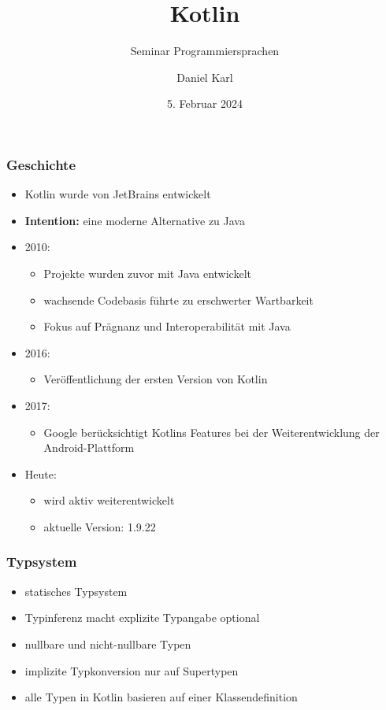 \documentclass{beamer}
\title{Kotlin}
\subtitle{Seminar Programmiersprachen}
\author[D. Karl]
{Daniel Karl}
\date{5. Februar 2024}
\begin{document}
\maketitle


\begin{frame}
\frametitle{Geschichte}
\begin{itemize}
    \item Kotlin wurde von JetBrains entwickelt
    \item \textbf{Intention:} eine moderne Alternative zu Java
    \item 2010:
    \begin{itemize}
        \item Projekte wurden zuvor mit Java entwickelt
        \item wachsende Codebasis führte zu erschwerter Wartbarkeit
        \item Fokus auf Prägnanz und Interoperabilität mit Java
    \end{itemize}
    \item 2016:
    \begin{itemize}
        \item Veröffentlichung der ersten Version von Kotlin
    \end{itemize}
    \item 2017:
    \begin{itemize}
        \item Google berücksichtigt Kotlins Features bei der Weiterentwicklung der Android-Plattform %
    \end{itemize}
    \item Heute:
    \begin{itemize}
        \item wird aktiv weiterentwickelt
        \item aktuelle Version: 1.9.22
    \end{itemize}
\end{itemize}
\end{frame}


\begin{frame}
\frametitle{Typsystem}
\begin{itemize}
\onehalfspacing
    \item statisches Typsystem
    \item Typinferenz macht explizite Typangabe optional
    \item nullbare und nicht-nullbare Typen %
    \item implizite Typkonversion nur auf Supertypen
    \item alle Typen in Kotlin basieren auf einer Klassendefinition
\end{itemize}
\end{frame}
\end{document}
